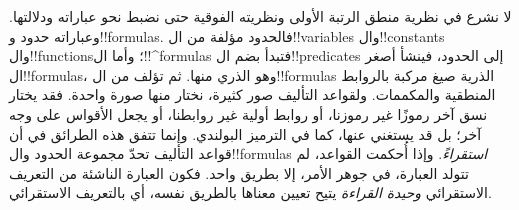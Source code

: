 \documentclass[../../../include/open-logic-section]{subfiles}
\begin{document}


لا نشرع في نظرية منطق الرتبة الأولى ونظريته الفوقية حتى نضبط
نحو عباراته ودلالتها. وعباراته حدود و!!{formula}s. فالحدود
مؤلفة من ال!!{variable}s وال!!{constant}s وال!!{function}s؛
وأما ال!!^{formula}s فتبدأ بضم ال!!{predicate}s إلى الحدود،
فينشأ أصغر ال!!{formula}s، وهو الذري منها. ثم تؤلف من
ال!!{formula}s الذرية صيغ مركبة بالروابط المنطقية والمكممات.
ولقواعد التأليف صور كثيرة، نختار منها صورة واحدة. فقد يختار
نسق آخر رموزًا غير رموزنا، أو روابط أولية غير روابطنا، أو
يجعل الأقواس على وجه آخر؛ بل قد يستغني عنها، كما في الترميز
البولندي. وإنما تتفق هذه الطرائق في أن قواعد التأليف تحدّ
مجموعة الحدود وال!!{formula}s \emph{استقراءً}. وإذا أُحكمت
القواعد، لم تتولد العبارة، في جوهر الأمر، إلا بطريق واحد.
فكون العبارة الناشئة من التعريف الاستقرائي \emph{وحيدة القراءة}
يتيح تعيين معناها بالطريق نفسه، أي بالتعريف الاستقرائي.
\end{document}
